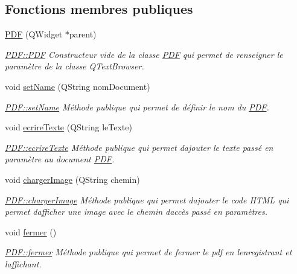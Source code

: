 \subsection*{Fonctions membres publiques}
\begin{DoxyCompactItemize}
\item 
\hyperlink{class_p_d_f_af73fdd2d9d2d8aad204895ff5ffd35c4}{P\+DF} (Q\+Widget $\ast$parent)
\begin{DoxyCompactList}\small\item\em \hyperlink{class_p_d_f_af73fdd2d9d2d8aad204895ff5ffd35c4}{P\+D\+F\+::\+P\+DF} Constructeur vide de la classe \hyperlink{class_p_d_f}{P\+DF} qui permet de renseigner le paramètre de la classe Q\+Text\+Browser. \end{DoxyCompactList}\item 
void \hyperlink{class_p_d_f_a09ab186beccd7afa32dd947532a83e78}{set\+Name} (Q\+String nom\+Document)
\begin{DoxyCompactList}\small\item\em \hyperlink{class_p_d_f_a09ab186beccd7afa32dd947532a83e78}{P\+D\+F\+::set\+Name} Méthode publique qui permet de définir le nom du \hyperlink{class_p_d_f}{P\+DF}. \end{DoxyCompactList}\item 
void \hyperlink{class_p_d_f_a7bb38923f4141702b3772ec41213917f}{ecrire\+Texte} (Q\+String le\+Texte)
\begin{DoxyCompactList}\small\item\em \hyperlink{class_p_d_f_a7bb38923f4141702b3772ec41213917f}{P\+D\+F\+::ecrire\+Texte} Méthode publique qui permet d\textquotesingle{}ajouter le texte passé en paramètre au document \hyperlink{class_p_d_f}{P\+DF}. \end{DoxyCompactList}\item 
void \hyperlink{class_p_d_f_a3c7d97ad7f3c7a390272d05c7f95e832}{charger\+Image} (Q\+String chemin)
\begin{DoxyCompactList}\small\item\em \hyperlink{class_p_d_f_a3c7d97ad7f3c7a390272d05c7f95e832}{P\+D\+F\+::charger\+Image} Méthode publique qui permet d\textquotesingle{}ajouter le code H\+T\+ML qui permet d\textquotesingle{}afficher une image avec le chemin d\textquotesingle{}accès passé en paramètres. \end{DoxyCompactList}\item 
void \hyperlink{class_p_d_f_a96a1cc767274d19eedec45ff7aca6b7a}{fermer} ()
\begin{DoxyCompactList}\small\item\em \hyperlink{class_p_d_f_a96a1cc767274d19eedec45ff7aca6b7a}{P\+D\+F\+::fermer} Méthode publique qui permet de fermer le pdf en l\textquotesingle{}enregistrant et l\textquotesingle{}affichant. \end{DoxyCompactList}\end{DoxyCompactItemize}
